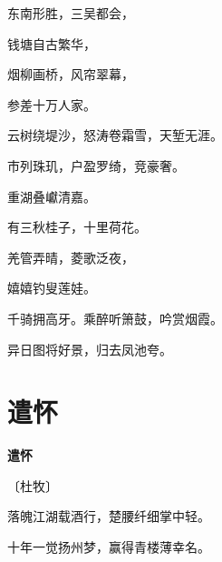 \documentclass[12pt,UTF-8,openany,fontset=none]{ctexbook}
\begin{document}
    \vspace{18pt}  %

\begin{center}
    \begin{Large}

        东南形胜，三吴都会，

        钱塘自古繁华，

        烟柳画桥，风帘翠幕，

        参差十万人家。

        云树绕堤沙，怒涛卷霜雪，天堑无涯。

        市列珠玑，户盈罗绮，竞豪奢。

        \vspace{18pt}  %

        重湖叠巘清嘉。

        有三秋桂子，十里荷花。

        羌管弄晴，菱歌泛夜，

        嬉嬉钓叟莲娃。

        千骑拥高牙。乘醉听箫鼓，吟赏烟霞。

        异日图将好景，归去凤池夸。

    \end{Large}

\end{center}

\vspace{8pt}
\clearpage

\section{遣怀}


\begin{center}
    {\bfseries 遣怀}

    \vspace{18pt}

    \begin{large}\xuwen
        〔杜牧〕
    \end{large}

\end{center}

    \vspace{18pt}

\begin{center}
    \begin{Large}

        落魄江湖载酒行，楚腰纤细掌中轻。

        十年一觉扬州梦，赢得青楼薄幸名。

    \end{Large}

\end{center}
\end{document}
